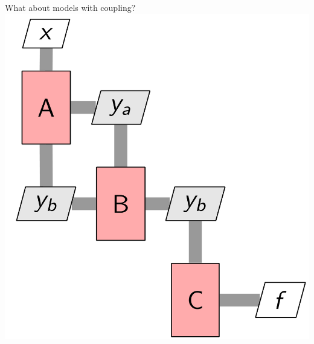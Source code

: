 \documentclass[aspectratio=169, usenames,dvipsnames, 14pt]{beamer}
\begin{document}
\begin{frame}{What about models with coupling?}
\centering
\includegraphics[scale=0.25]{images/slide77.png}
    
\end{frame}

\end{document}
